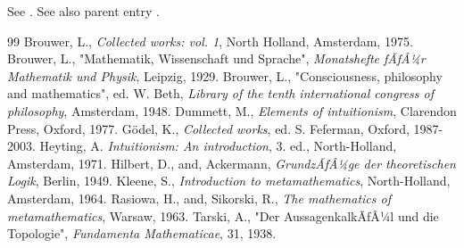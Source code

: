 \documentclass[12pt]{article}
\begin{document}
See . See also parent entry .

\begin{thebibliography} {99}
 Brouwer, L., \emph{Collected works: vol. 1}, North Holland, Amsterdam, 1975.
 Brouwer, L., "Mathematik, Wissenschaft und Sprache", \emph{Monatshefte fÃƒÂ¼r Mathematik und Physik}, Leipzig, 1929.
 Brouwer, L., "Consciousness, philosophy and mathematics", ed. W. Beth, \emph{Library of the tenth international congress of philosophy}, Amsterdam, 1948.
 Dummett, M., \emph{Elements of intuitionism}, Clarendon Press, Oxford, 1977.
 G\"{o}del, K., \emph{Collected works}, ed. S. Feferman, Oxford, 1987-2003.
 Heyting, A. \emph{Intuitionism: An introduction}, 3. ed., North-Holland, Amsterdam, 1971.
 Hilbert, D., and, Ackermann, \emph{GrundzÃƒÂ¼ge der theoretischen Logik}, Berlin, 1949.
 Kleene, S., \emph{Introduction to metamathematics}, North-Holland, Amsterdam, 1964.
 Rasiowa, H., and, Sikorski, R., \emph{The mathematics of metamathematics}, Warsaw, 1963.
 Tarski, A., "Der AussagenkalkÃƒÂ¼l und die Topologie", \emph{Fundamenta Mathematicae}, 31, 1938.
\end{thebibliography}
\end{document}
